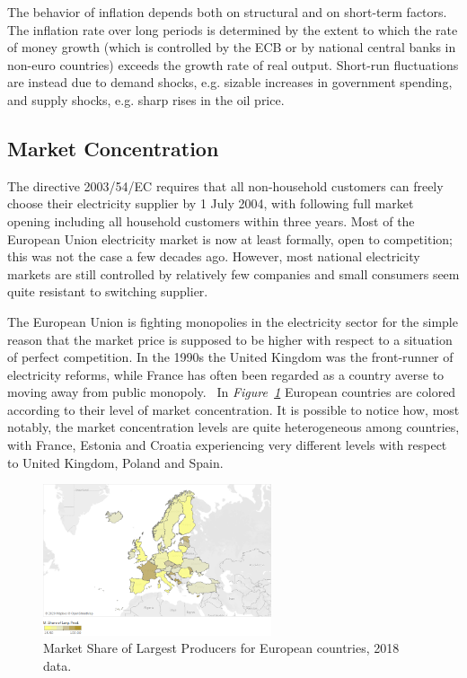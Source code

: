 \documentclass[a4paper,12pt]{book}
\begin{document}
The behavior of inflation depends both on structural and on short-term factors. The inflation rate over long periods is determined by the extent to which the rate of money growth (which is controlled by the ECB or by national central banks in non-euro countries) exceeds the growth rate of real output. Short-run fluctuations are instead due to demand shocks, e.g. sizable increases in government spending, and supply shocks, e.g. sharp rises in the oil price.~\cite{ball1993causes}

\subsection{Market Concentration}

The directive 2003/54/EC requires that all non-household customers can freely choose their electricity supplier by 1 July 2004, with following full market opening including all household customers within three years. Most of the European Union electricity market is now at least formally, open to competition; this was not the case a few decades ago. However, most national electricity markets are still controlled by relatively few companies and small consumers seem quite resistant to switching supplier.~\cite{jamasb2005electricity}

The European Union is fighting monopolies in the electricity sector for the simple reason that the market price is supposed to be higher with respect to a situation of perfect competition. In the 1990s the United Kingdom was the front-runner of electricity reforms, while France has often been regarded as a country averse to moving away from public monopoly.~\cite{fiorio2009reform} In \textit{Figure~\ref{fig:conc}} European countries are colored according to their level of market concentration. It is possible to notice how, most notably, the market concentration levels are quite heterogeneous among countries, with France, Estonia and Croatia experiencing very different levels with respect to United Kingdom, Poland and Spain. 

\begin{figure}[tb]
\begin{center}
\captionsetup{justification=centering}
\includegraphics[width=0.6\textwidth]{Images/conc.png}
\caption{Market Share of Largest Producers for European countries, 2018 data. }
\label{fig:conc}
\end{center}
\end{figure}
\end{document}
